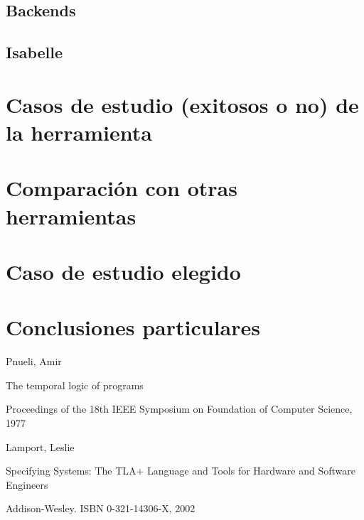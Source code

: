 \documentclass[spanish]{llncs}
\begin{document}
  \subsection{Backends}
    \subsection{Isabelle}
    
\section{Casos de estudio (exitosos o no) de la herramienta}
\section{Comparación con otras herramientas}
\section{Caso de estudio elegido}
\section{Conclusiones particulares}


%
%
\begin{thebibliography}{5}
%
Pnueli, Amir

The temporal logic of programs

Proceedings of the 18th IEEE Symposium on Foundation of Computer Science, 1977

Lamport, Leslie

Specifying Systems: The TLA+ Language and Tools for Hardware and Software Engineers

Addison-Wesley. ISBN 0-321-14306-X, 2002




\end{thebibliography}


\clearpage
{} %
\renewcommand{\indexname}{Author Index}
\printindex
\clearpage
{} %
\renewcommand{\indexname}{Subject Index}

\end{document}
